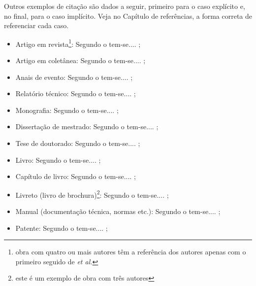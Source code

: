 \documentclass{templateppgmo}
\numberwithin{figure}{chapter}
\numberwithin{table}{chapter}
\numberwithin{quadro}{chapter}
\numberwithin{algoritmo}{chapter}
\numberwithin{codigo}{chapter}
\begin{document}
  	Outros exemplos de citação são dados a seguir, primeiro para o caso explícito e, no final, para o caso implícito. Veja no Capítulo de referências, a forma correta de referenciar cada caso.

  	\begin{itemize}
  	\item Artigo em revista\footnote{obra com quatro ou mais autores têm a referência dos autores apenas com o primeiro seguido de \textit{et al.}}: Segundo o  tem-se.... \cite{silva:artigo,artigo1};

  	\item Artigo em coletânea: Segundo o  tem-se.... \cite{silva:incollection};

  	\item Anais de evento: Segundo o  tem-se.... \cite{silva:inproceedings};

  	\item Relatório técnico: Segundo o  tem-se.... \cite{silva:tech};

  	\item Monografia: Segundo o  tem-se.... \cite{silva:monography};

  	\item Dissertação de mestrado: Segundo o  tem-se.... \cite{silva:master};

  	\item Tese de doutorado: Segundo o  tem-se.... \cite{barcelos1998};

  	
  	\item Livro: Segundo o  tem-se.... \cite{wazlawick:2009};


  	\item Capítulo de livro: Segundo o  tem-se.... \cite{silva:inbook};

  	\item Livreto (livro de brochura)\footnote{este é um exemplo de obra com três autores}: Segundo o  tem-se.... \cite{silva:booklet};

  	\item Manual (documentação técnica, normas etc.): Segundo o  tem-se.... \cite{NBR6023:2000};

  	\item Patente: Segundo o  tem-se.... \cite{cruvinel1989};


\end{itemize}
\end{document}
